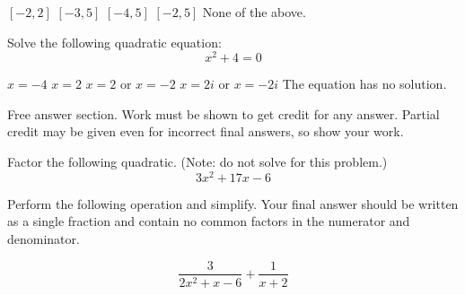 \begin{questions}
\begin{checkboxes}
    \choice $[-2,2]$
    \choice $[-3,5]$
    \choice $[-4,5]$
    \choice $[-2,5]$
    \choice None of the above.
\end{checkboxes}

\question[3] %
Solve the following quadratic equation:\\
\[x^2+4=0\]
\begin{checkboxes}
    \choice $x=-4$
    \choice $x=2$
    \choice $x=2$ or $x=-2$
    \choice $x=2i$ or $x=-2i$
    \choice The equation has no solution.
\end{checkboxes}

\newpage
\hspace{-.5in}Free answer section. Work must be shown to get credit for any answer. Partial credit may be given even for incorrect final answers, so show your work.

\question[5] %
Factor the following quadratic. (Note: do not solve for this problem.)
\[
3x^2+17x-6
\]
\vfill


\question[6] Perform the following operation and simplify. Your final answer should be
written as a single fraction and contain no common factors in the numerator and
denominator.

\[
\frac{3}{2x^2+x-6} + \frac{1}{x+2}
\]
\vfill
\newpage


\end{questions}
